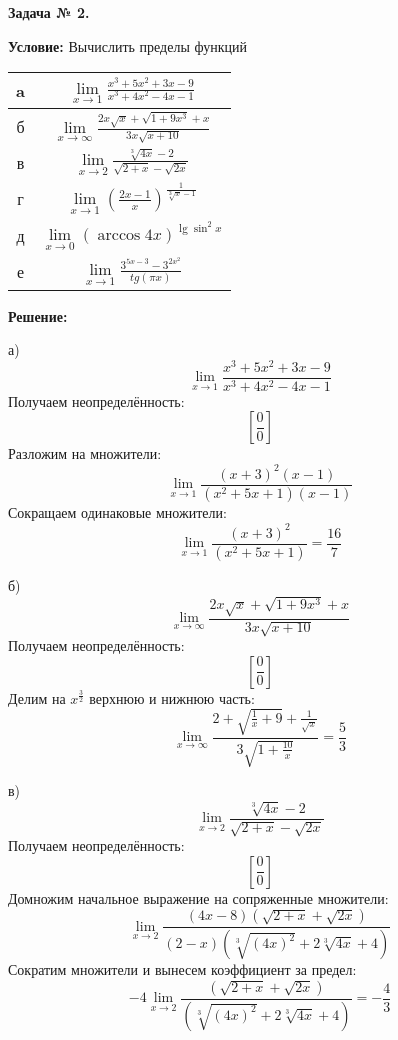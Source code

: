 \documentclass[12pt]{article}
\begin{document}
\newpage
\begin{center}
\textbf{Задача № 2.}   
\end{center}

\textbf{Условие:}
Вычислить пределы функций
\begin{table}[h]
    \centering
    \begin{tabular}{c|c}
         a & $\lim\limits_{x\rightarrow 1} \frac{x^3+5x^2+3x-9}{x^3+4x^2-4x-1}$ \\
         \hline
         б & $\lim\limits_{x\rightarrow\infty} \frac{2x\sqrt{x} + \sqrt{1+9x^3}+x}{3x\sqrt{x+10}}$ \\
         \hline
         в & $\lim\limits_{x\rightarrow 2} \frac{\sqrt[3]{4x}-2}{\sqrt{2+x}-\sqrt{2x}}$\\
         \hline
         г & $\lim\limits_{x\rightarrow 1} (\frac{2x-1}{x})^{\frac{1}{\sqrt[3]{x}-1}}  $\\
         \hline
         д & $\lim\limits_{x\rightarrow 0} ({\arccos{4x}})^{\lg{\sin^2{x}}}$ \\
         \hline
         е & $\lim\limits_{x\rightarrow 1} \frac{3^{5x-3} - 3^{2x^{2}}}{tg(\pi x)}$
    \end{tabular}
\end{table}

\textbf{Решение:}

а)
$$\lim\limits_{x\rightarrow 1} \frac{x^3+5x^2+3x-9}{x^3+4x^2-4x-1}$$
Получаем неопределённость: $$[\frac{0}{0}]$$
Разложим на множители:
$$\lim\limits_{x\rightarrow 1} \frac{(x+3)^{2}(x-1)}{(x^2+5x+1)(x-1)} $$
Сокращаем одинаковые множители:
$$\lim\limits_{x\rightarrow 1} \frac{(x+3)^{2}}{(x^2+5x+1)}=\frac{16}{7}$$

б)
$$\lim\limits_{x\rightarrow\infty} \frac{2x\sqrt{x} + \sqrt{1+9x^3}+x}{3x\sqrt{x+10}}$$
Получаем неопределённость: $$[\frac{0}{0}]$$
Делим на $x^{\frac{3}{2}}$ верхнюю и нижнюю часть:
$$\lim\limits_{x\rightarrow\infty} \frac{2+\sqrt{\frac{1}{x}+9}+\frac{1}{\sqrt{x}}}{3\sqrt{1+\frac{10}{x}}} = \frac{5}{3} $$


в)
$$\lim\limits_{x\rightarrow 2} \frac{\sqrt[3]{4x}-2}{\sqrt{2+x}-\sqrt{2x}}$$
Получаем неопределённость: $$[\frac{0}{0}]$$
Домножим начальное выражение на сопряженные множители:
$$\lim\limits_{x\rightarrow 2} \frac{(4x-8)(\sqrt{2+x}+\sqrt{2x})}{(2-x)(\sqrt[3]{(4x)^{2}}+2\sqrt[3]{4x}+4)} $$
\newpage
Сократим множители и вынесем коэффициент за предел:
$$-4\lim\limits_{x\rightarrow 2} \frac{(\sqrt{2+x}+\sqrt{2x})}{(\sqrt[3]{(4x)^{2}}+2\sqrt[3]{4x}+4)} =-\frac{4}{3} $$
\end{document}
